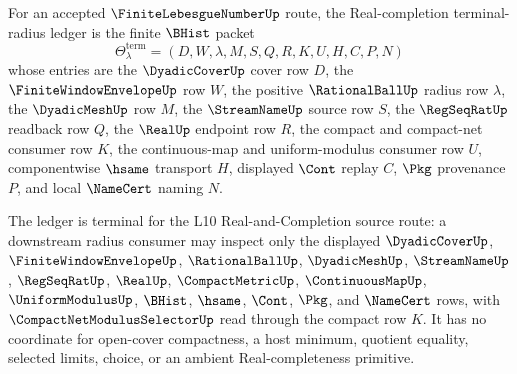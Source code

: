 \begin{definition}
\label{def:finite-lebesgue-number-real-completion-terminal-radius-ledger}
For an accepted $\FiniteLebesgueNumberUp$ route, the Real-completion terminal-radius ledger is the finite $\BHist$ packet
$$
\Theta_{\lambda}^{\mathrm{term}}=(D,W,\lambda,M,S,Q,R,K,U,H,C,P,N)
$$
whose entries are the $\DyadicCoverUp$ cover row $D$, the $\FiniteWindowEnvelopeUp$ row $W$, the positive $\RationalBallUp$ radius row $\lambda$, the $\DyadicMeshUp$ row $M$, the $\StreamNameUp$ source row $S$, the $\RegSeqRatUp$ readback row $Q$, the $\RealUp$ endpoint row $R$, the compact and compact-net consumer row $K$, the continuous-map and uniform-modulus consumer row $U$, componentwise $\hsame$ transport $H$, displayed $\Cont$ replay $C$, $\Pkg$ provenance $P$, and local $\NameCert$ naming $N$.

The ledger is terminal for the L10 Real-and-Completion source route: a downstream radius consumer may inspect only the displayed $\DyadicCoverUp$, $\FiniteWindowEnvelopeUp$, $\RationalBallUp$, $\DyadicMeshUp$, $\StreamNameUp$, $\RegSeqRatUp$, $\RealUp$, $\CompactMetricUp$, $\ContinuousMapUp$, $\UniformModulusUp$, $\BHist$, $\hsame$, $\Cont$, $\Pkg$, and $\NameCert$ rows, with $\CompactNetModulusSelectorUp$ read through the compact row $K$. It has no coordinate for open-cover compactness, a host minimum, quotient equality, selected limits, choice, or an ambient Real-completeness primitive.
\end{definition}

